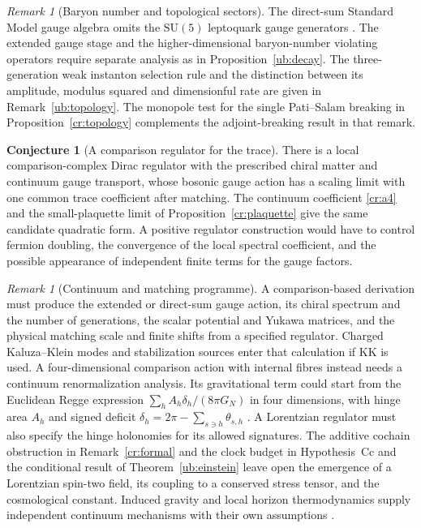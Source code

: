\documentclass[aps,pra,onecolumn,superscriptaddress,nofootinbib,10pt]{revtex4-2}
\theoremstyle{definition}
\newtheorem{conjecture}[theorem]{Conjecture}
\theoremstyle{remark}
\newtheorem{remark}[theorem]{Remark}
\newcommand{\SU}{\mathrm{SU}}
\begin{document}
\begin{remark}[Baryon number and topological sectors]\label{cr:baryon}
The direct-sum Standard Model gauge algebra omits the
$\SU(5)$ leptoquark gauge generators \cite{cr:gg}.
The extended gauge stage and the higher-dimensional
baryon-number violating operators require separate analysis
as in Proposition~\ref{ub:decay}. The three-generation weak
instanton selection rule and the distinction between its
amplitude, modulus squared and dimensionful rate are given in
Remark~\ref{ub:topology}. The monopole test for the single
Pati--Salam breaking in Proposition~\ref{cr:topology}
complements the adjoint-breaking result in that remark.
\end{remark}

\begin{conjecture}[A comparison regulator for the trace]\label{cr:conjecture}
There is a local comparison-complex Dirac regulator with the
prescribed chiral matter and continuum gauge transport, whose
bosonic gauge action has a scaling limit with one common trace
coefficient after matching. The continuum coefficient
\eqref{cr:a4} and the small-plaquette limit of
Proposition~\ref{cr:plaquette} give the same candidate quadratic
form. A positive regulator construction would have to control
fermion doubling, the convergence of the local spectral
coefficient, and the possible appearance of independent
finite terms for the gauge factors.
\end{conjecture}

\begin{remark}[Continuum and matching programme]\label{cr:programme}
A comparison-based derivation must produce the extended or
direct-sum gauge action, its chiral spectrum and the number of
generations, the scalar potential and Yukawa matrices, and the
physical matching scale and finite shifts from a specified
regulator. Charged Kaluza--Klein modes and stabilization
sources enter that calculation if KK is used. A four-dimensional
comparison action with internal fibres instead needs a
continuum renormalization analysis. Its gravitational term
could start from the Euclidean Regge expression
$\sum_h A_h\delta_h/(8\pi G_N)$ in four dimensions, with hinge
area $A_h$ and signed deficit $\delta_h=2\pi-\sum_{s\ni h}\theta_{s,h}$
\cite{ub:regge}. A Lorentzian regulator must also specify the hinge holonomies for
its allowed signatures. The additive cochain obstruction in
Remark~\ref{cr:formal} and the clock budget in
Hypothesis~Cc and the conditional result of
Theorem~\ref{ub:einstein} leave open the emergence of a
Lorentzian spin-two field, its coupling to a conserved stress
tensor, and the cosmological constant. Induced gravity and
local horizon thermodynamics supply independent continuum
mechanisms with their own assumptions \cite{cr:sakharov,n1-jacobson}.
\end{remark}
\end{document}
